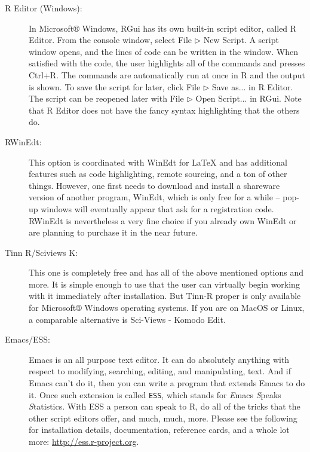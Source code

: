 \documentclass[captions=tableheading]{scrbook}
\begin{document}
\begin{description}
\item[\textsf{R} Editor (Windows):] In Microsoft\(\circledR\) Windows, \textsf{R}Gui has its own built-in script editor, called \textsf{R} Editor. From the console window, select \textsf{File} \textsf{\(\triangleright\)} \textsf{New} \textsf{Script}. A script window opens, and the lines of code can be written in the window. When satisfied with the code, the user highlights all of the commands and presses \textsf{Ctrl+R}. The commands are automatically run at once in \textsf{R} and the output is shown. To save the script for later, click \textsf{File} \textsf{\(\triangleright\)} \textsf{Save as...} in \textsf{R} Editor. The script can be reopened later with \textsf{File} \textsf{\(\triangleright\)} \textsf{Open Script...} in \textsf{RGui}. Note that \textsf{R} Editor does not have the fancy syntax highlighting that the others do.
\item[\textsf{R}WinEdt:] This option is coordinated with WinEdt for \LaTeX{} and has additional features such as code highlighting, remote sourcing, and a ton of other things. However, one first needs to download and install a shareware version of another program, WinEdt, which is only free for a while -- pop-up windows will eventually appear that ask for a registration code. \textsf{R}WinEdt is nevertheless a very fine choice if you already own WinEdt or are planning to purchase it in the near future.
\item[Tinn \textsf{R}/Sciviews K:] This one is completely free and has all of the above mentioned options and more. It is simple enough to use that the user can virtually begin working with it immediately after installation. But Tinn-\textsf{R} proper is only available for Microsoft\(\circledR\) Windows operating systems. If you are on MacOS or Linux, a comparable alternative is Sci-Views - Komodo Edit.
\item[Emacs/ESS:] Emacs is an all purpose text editor. It can do absolutely anything with respect to modifying, searching, editing, and manipulating, text. And if Emacs can't do it, then you can write a program that extends Emacs to do it. Once such extension is called \texttt{ESS}, which stands for \emph{E}macs \emph{S}peaks \emph{S}tatistics. With ESS a person can speak to \textsf{R}, do all of the tricks that the other script editors offer, and much, much, more. Please see the following for installation details, documentation, reference cards, and a whole lot more: \href{http://ess.r-project.org}{http://ess.r-project.org}.

\end{description}
\end{document}
